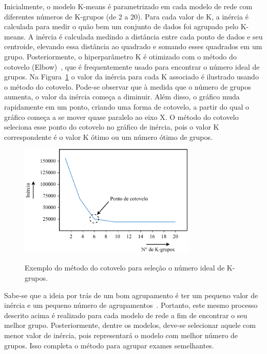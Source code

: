 Inicialmente, o modelo K-means é parametrizado em cada modelo de rede com diferentes números de K-grupos (de 2 a 20). Para cada valor de K, a inércia é calculada para medir o quão bem um conjunto de dados foi agrupado pelo K-means. A inércia é calculada medindo a distância entre cada ponto de dados e seu centroide, elevando essa distância ao quadrado e somando esses quadrados em um grupo. Posteriormente, o hiperparâmetro K é otimizado com o método do cotovelo (Elbow)~\cite{joshi2013modified}, que é frequentemente usado para encontrar o número ideal de grupos. Na Figura~\ref{fig:metodo-cotovelo} o valor da inércia para cada K associado é ilustrado usando o método do cotovelo. Pode-se observar que à medida que o número de grupos aumenta, o valor da inércia começa a diminuir. Além disso, o gráfico muda rapidamente em um ponto, criando uma forma de cotovelo, a partir do qual o gráfico começa a se mover quase paralelo ao eixo X. O método do cotovelo seleciona esse ponto do cotovelo no gráfico de inércia, pois o valor K correspondente é o valor K ótimo ou um número ótimo de grupos.

\begin{figure}[!ht]
    \centering
    \caption{Exemplo do método do cotovelo para seleção o número ideal de K-grupos.}
    \includegraphics[width=0.75\textwidth]{figuras/metodo-cotovelo.pdf}
    \label{fig:metodo-cotovelo}
\end{figure}

Sabe-se que a ideia por trás de um bom agrupamento é ter um pequeno valor de inércia e um pequeno número de agrupamentos~\cite{joshi2013modified}. Portanto, este mesmo processo descrito acima é realizado para cada modelo de rede a fim de encontrar o seu melhor grupo. Posteriormente, dentre os modelos, deve-se selecionar aquele com menor valor de inércia, pois representará o modelo com melhor número de grupos. Isso completa o método para agrupar exames semelhantes.

